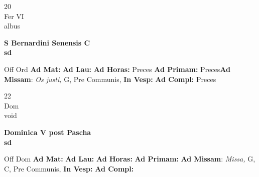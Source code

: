 \documentclass[10pt, openany]{book}
\begin{document}
    \begin{center}
        \begin{minipage}{3.5in}
            \vspace{2em}
            \begin{minipage}{0.5in}
                {\Huge 20} \\
                {\normalsize Fer VI} \\
                {\normalsize albus}
            \end{minipage}
            \begin{minipage}{3.0in}
                \textbf{ \large S Bernardini Senensis C \\
                \textnormal{\normalsize sd}} \\ 
            \end{minipage}
            \begin{justify}Off Ord
                \textbf{Ad Mat: }
                \textbf{Ad Lau: }
                \textbf{Ad Horas: }Preces
                \textbf{Ad Primam: }Preces\textbf{Ad Missam}: \textit{Os justi,} G, Pre Communis,  
                \textbf{In Vesp: }
                \textbf{Ad Compl: }Preces
            \end{justify}
        \end{minipage}
    \end{center}

    \begin{center}
        \begin{minipage}{3.5in}
            \vspace{2em}
            \begin{minipage}{0.5in}
                {\Huge 22} \\
                {\normalsize Dom} \\
                {\normalsize void}
            \end{minipage}
            \begin{minipage}{3.0in}
                \textbf{ \large Dominica V post Pascha \\
                \textnormal{\normalsize sd}} \\ 
            \end{minipage}
            \begin{justify}Off Dom
                \textbf{Ad Mat: }
                \textbf{Ad Lau: }
                \textbf{Ad Horas: }
                \textbf{Ad Primam: }\textbf{Ad Missam}: \textit{Missa,} G, C, Pre Communis,  
                \textbf{In Vesp: }
                \textbf{Ad Compl: }
            \end{justify}
        \end{minipage}
    \end{center}
\end{document}
